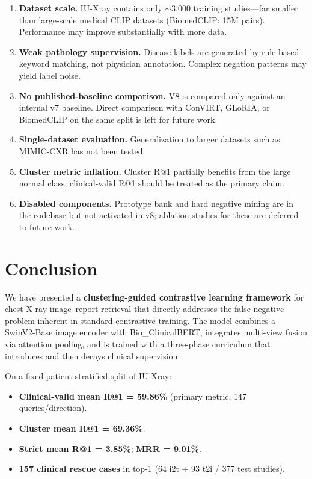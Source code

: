 \documentclass[11pt, a4paper]{article}
\begin{document}
\begin{enumerate}[leftmargin=2em, label=\arabic*.]
  \item \textbf{Dataset scale.}
    IU-Xray contains only $\sim$3,000 training studies---far smaller than
    large-scale medical CLIP datasets (BiomedCLIP: 15M pairs).
    Performance may improve substantially with more data.
  \item \textbf{Weak pathology supervision.}
    Disease labels are generated by rule-based keyword matching, not
    physician annotation.
    Complex negation patterns may yield label noise.
  \item \textbf{No published-baseline comparison.}
    V8 is compared only against an internal v7 baseline.
    Direct comparison with ConVIRT, GLoRIA, or BiomedCLIP on the same
    split is left for future work.
  \item \textbf{Single-dataset evaluation.}
    Generalization to larger datasets such as MIMIC-CXR has not been tested.
  \item \textbf{Cluster metric inflation.}
    Cluster R@1 partially benefits from the large normal class;
    clinical-valid R@1 should be treated as the primary claim.
  \item \textbf{Disabled components.}
    Prototype bank and hard negative mining are in the codebase but not
    activated in v8; ablation studies for these are deferred to future work.
\end{enumerate}

\section{Conclusion}
\label{sec:conclusion}

We have presented a \textbf{clustering-guided contrastive learning framework}
for chest X-ray image--report retrieval that directly addresses the
false-negative problem inherent in standard contrastive training.
The model combines a SwinV2-Base image encoder with Bio\_ClinicalBERT,
integrates multi-view fusion via attention pooling, and is trained with a
three-phase curriculum that introduces and then decays clinical supervision.

On a fixed patient-stratified split of IU-Xray:
\begin{itemize}[leftmargin=1.5em]
  \item \textbf{Clinical-valid mean R@1 = 59.86\%} (primary metric, 147 queries/direction).
  \item \textbf{Cluster mean R@1 = 69.36\%}.
  \item \textbf{Strict mean R@1 = 3.85\%}; \textbf{MRR = 9.01\%}.
  \item \textbf{157 clinical rescue cases} in top-1 (64 i2t + 93 t2i / 377 test studies).
\end{itemize}
\end{document}
